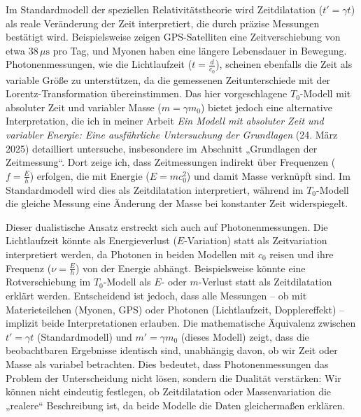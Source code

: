 \documentclass[a4paper,12pt]{article}
\begin{document}
	Im Standardmodell der speziellen Relativitätstheorie wird Zeitdilatation (\( t' = \gamma t \)) als reale Veränderung der Zeit interpretiert, die durch präzise Messungen bestätigt wird. Beispielsweise zeigen GPS-Satelliten eine Zeitverschiebung von etwa \( 38 \, \mu\text{s} \) pro Tag, und Myonen haben eine längere Lebensdauer in Bewegung. Photonenmessungen, wie die Lichtlaufzeit (\( t = \frac{d}{c_0} \)), scheinen ebenfalls die Zeit als variable Größe zu unterstützen, da die gemessenen Zeitunterschiede mit der Lorentz-Transformation übereinstimmen. Das hier vorgeschlagene \( T_0 \)-Modell mit absoluter Zeit und variabler Masse (\( m = \gamma m_0 \)) bietet jedoch eine alternative Interpretation, die ich in meiner Arbeit \textit{Ein Modell mit absoluter Zeit und variabler Energie: Eine ausführliche Untersuchung der Grundlagen} (24. März 2025) detailliert untersuche, insbesondere im Abschnitt „Grundlagen der Zeitmessung“. Dort zeige ich, dass Zeitmessungen indirekt über Frequenzen (\( f = \frac{E}{h} \)) erfolgen, die mit Energie (\( E = m c_0^2 \)) und damit Masse verknüpft sind. Im Standardmodell wird dies als Zeitdilatation interpretiert, während im \( T_0 \)-Modell die gleiche Messung eine Änderung der Masse bei konstanter Zeit widerspiegelt.
	
	Dieser dualistische Ansatz erstreckt sich auch auf Photonenmessungen. Die Lichtlaufzeit könnte als Energieverlust (\( E \)-Variation) statt als Zeitvariation interpretiert werden, da Photonen in beiden Modellen mit \( c_0 \) reisen und ihre Frequenz (\( \nu = \frac{E}{h} \)) von der Energie abhängt. Beispielsweise könnte eine Rotverschiebung im \( T_0 \)-Modell als \( E \)- oder \( m \)-Verlust statt als Zeitdilatation erklärt werden. Entscheidend ist jedoch, dass alle Messungen – ob mit Materieteilchen (Myonen, GPS) oder Photonen (Lichtlaufzeit, Dopplereffekt) – implizit beide Interpretationen erlauben. Die mathematische Äquivalenz zwischen \( t' = \gamma t \) (Standardmodell) und \( m' = \gamma m_0 \) (dieses Modell) zeigt, dass die beobachtbaren Ergebnisse identisch sind, unabhängig davon, ob wir Zeit oder Masse als variabel betrachten. Dies bedeutet, dass Photonenmessungen das Problem der Unterscheidung nicht lösen, sondern die Dualität verstärken: Wir können nicht eindeutig festlegen, ob Zeitdilatation oder Massenvariation die „realere“ Beschreibung ist, da beide Modelle die Daten gleichermaßen erklären.
	
\end{document}
